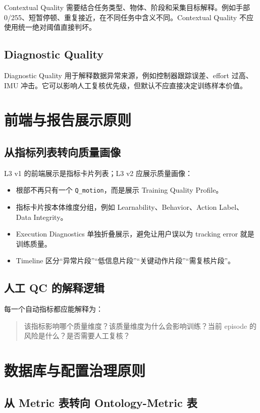 \documentclass[UTF8,zihao=-4,oneside,openany]{ctexrep}
\newcommand{\Code}[1]{\texttt{#1}}
\begin{document}
Contextual Quality 需要结合任务类型、物体、阶段和采集目标解释。例如手部 0/255、短暂停顿、重复接近，在不同任务中含义不同。Contextual Quality 不应使用统一绝对阈值直接判坏。

\subsection{Diagnostic Quality}

Diagnostic Quality 用于解释数据异常来源，例如控制器跟踪误差、effort 过高、IMU 冲击。它可以影响人工复核优先级，但默认不应直接决定训练样本价值。

\section{前端与报告展示原则}

\subsection{从指标列表转向质量画像}

L3 v1 的前端展示是指标卡片列表；L3 v2 应展示质量画像：
\begin{itemize}
  \item 根部不再只有一个 \Code{Q\_motion}，而是展示 Training Quality Profile。
  \item 指标卡片按本体维度分组，例如 Learnability、Behavior、Action Label、Data Integrity。
  \item Execution Diagnostics 单独折叠展示，避免让用户误以为 tracking error 就是训练质量。
  \item Timeline 区分“异常片段”“低信息片段”“关键动作片段”“需复核片段”。
\end{itemize}

\subsection{人工 QC 的解释逻辑}

每一个自动指标都应能解释为：
\begin{quote}
该指标影响哪个质量维度？该质量维度为什么会影响训练？当前 episode 的风险是什么？是否需要人工复核？
\end{quote}

\section{数据库与配置治理原则}

\subsection{从 Metric 表转向 Ontology-Metric 表}
\end{document}
